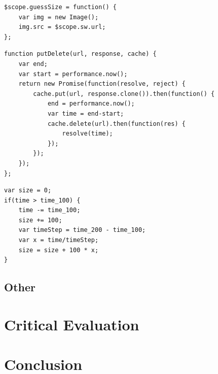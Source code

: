 \documentclass[10pt,a4paper,twoside]{book}
\begin{document}

\begin{lstlisting}[caption={Loading file as an Image},label={SWimg}]
$scope.guessSize = function() {
	var img = new Image();
	img.src = $scope.sw.url;
};
\end{lstlisting}

\begin{lstlisting}[caption={JavaScript code for measuring the time it takes to write to cache.},label={putdelete}]
function putDelete(url, response, cache) {
    var end;
    var start = performance.now();
    return new Promise(function(resolve, reject) {
        cache.put(url, response.clone()).then(function() {
            end = performance.now();
            var time = end-start;
            cache.delete(url).then(function(res) {
                resolve(time);
            });
        });
    });
};
\end{lstlisting}

\begin{lstlisting}[caption={JavaScript code for estimating the size of a file.},label={SWsize}]
var size = 0;
if(time > time_100) {
    time -= time_100;
    size += 100;
    var timeStep = time_200 - time_100;
    var x = time/timeStep;
    size = size + 100 * x;
}
\end{lstlisting}



\section{Other}




\chapter{Critical Evaluation}
\label{chap:evaluation}



\chapter{Conclusion}
\label{chap:conclusion}




\cleardoublepage
\pagestyle{marked}



\end{document}

